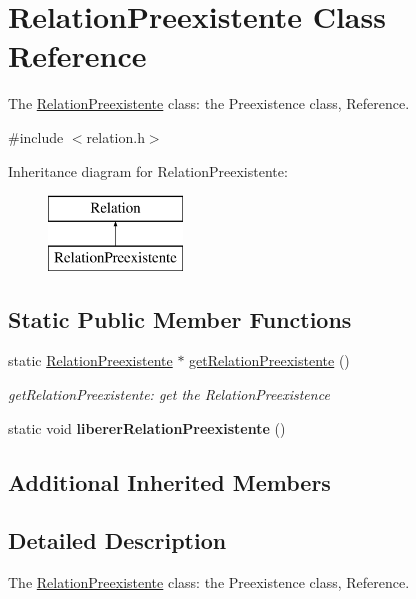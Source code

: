 \hypertarget{class_relation_preexistente}{}\section{Relation\+Preexistente Class Reference}
\label{class_relation_preexistente}


The \hyperlink{class_relation_preexistente}{Relation\+Preexistente} class\+: the Preexistence class, Reference.  




{\ttfamily \#include $<$relation.\+h$>$}

Inheritance diagram for Relation\+Preexistente\+:\begin{figure}[H]
\begin{center}
\leavevmode
\includegraphics[height=2.000000cm]{class_relation_preexistente}
\end{center}
\end{figure}
\subsection*{Static Public Member Functions}
\begin{DoxyCompactItemize}
\item 
static \hyperlink{class_relation_preexistente}{Relation\+Preexistente} $\ast$ \hyperlink{class_relation_preexistente_afd2c7ee8104d9dee00b52e5af1f5ed59}{get\+Relation\+Preexistente} ()
\begin{DoxyCompactList}\small\item\em get\+Relation\+Preexistente\+: get the Relation\+Preexistence \end{DoxyCompactList}\item 
\mbox{\label{class_relation_preexistente_ab6d6d23dc7edfb6773c56ffad69baf8f}} 
static void {\bfseries liberer\+Relation\+Preexistente} ()
\end{DoxyCompactItemize}
\subsection*{Additional Inherited Members}


\subsection{Detailed Description}
The \hyperlink{class_relation_preexistente}{Relation\+Preexistente} class\+: the Preexistence class, Reference. 

